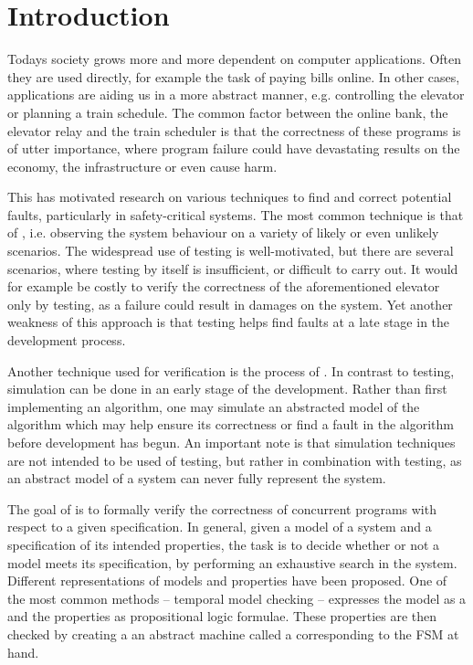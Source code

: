 \newpage
\section{Introduction}
Todays society grows more and more dependent on computer applications. Often they are used directly, for example the task of paying bills online. In other cases, applications are aiding us in a more abstract manner, e.g. controlling the elevator or planning a train schedule. The common factor between the online bank, the elevator relay and the train scheduler is that the correctness of these programs is of utter importance, where program failure could have devastating results on the economy, the infrastructure or even cause harm.

This has motivated research on various techniques to find and correct potential faults, particularly in safety-critical systems. The most common technique is that of , i.e. observing the system behaviour on a variety of likely or even unlikely scenarios. The widespread use of testing is well-motivated, but there are several scenarios, where testing by itself is insufficient, or difficult to carry out. It would for example be costly to verify the correctness of the aforementioned elevator only by testing, as a failure could result in damages on the system. Yet another weakness of this approach is that testing helps find faults at a late stage in the development process.

Another technique used for verification is the process of . In contrast to testing, simulation can be done in an early stage of the development. Rather than first implementing an algorithm, one may simulate an abstracted model of the algorithm which may help ensure its correctness or find a fault in the algorithm before development has begun. An important note is that simulation techniques are not intended to be used  of testing, but rather in combination with testing, as an abstract model of a system can never fully represent the system.

The goal of  is to formally verify the correctness of concurrent programs with respect to a given specification. %
In general, given a model of a system and a specification of its intended properties, the task is to decide whether or not a model meets its specification, by performing an exhaustive search in the system. Different representations of models and properties have been proposed. One of the most common methods -- temporal model checking -- expresses the model as a  and the properties as propositional logic formulae. These properties are then checked by creating a an abstract machine called a  corresponding to the FSM at hand.

